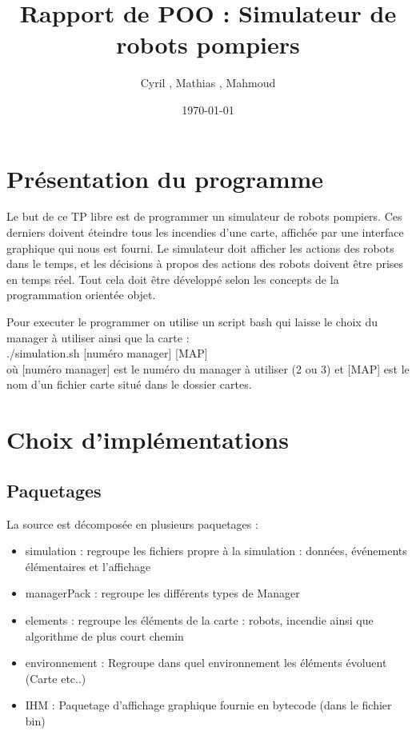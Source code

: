 \documentclass[a4paper,11pt]{article}
\title{Rapport de POO : Simulateur de robots pompiers}
\author{Cyril \bsc{Dutrieux}, Mathias \bsc{Biehler},  Mahmoud \bsc{Bentriou}}
\date{\today}
\begin{document}

\maketitle

\tableofcontents

\newpage

\section{Présentation du programme}

Le but de ce TP libre est de programmer un simulateur de robots pompiers. Ces derniers doivent éteindre tous les incendies d'une carte, affichée par une interface graphique qui nous est fourni. Le simulateur doit afficher les actions des robots dans le temps, et les décisions à propos des actions des robots doivent être prises en temps réel. Tout cela doit être développé selon les concepts de la programmation orientée objet.

Pour executer le programmer on utilise un script bash qui laisse le choix du manager à utiliser ainsi que la carte : \\
./simulation.sh [numéro manager] [MAP] \\
où [numéro manager] est le numéro du manager à utiliser (2 ou 3) et [MAP] est le nom d'un fichier carte situé dans le dossier cartes.

\section{Choix d'implémentations}

\subsection{Paquetages}

La source est décomposée en plusieurs paquetages :
\begin{itemize}
\item simulation : regroupe les fichiers propre à la simulation : données, événements élémentaires et l'affichage
\item managerPack : regroupe les différents types de Manager 
\item elements : regroupe les éléments de la carte : robots, incendie ainsi que  algorithme de plus court chemin
\item environnement : Regroupe dans quel environnement les éléments évoluent (Carte etc..)
\item IHM : Paquetage d'affichage graphique fournie en bytecode (dans le fichier bin)
\end{itemize}
\end{document}
